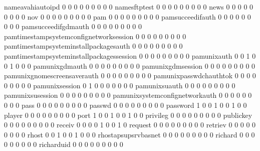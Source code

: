 \documentclass[compress,8pt]{beamer}
\begin{document}
\begin{frame}
\begin{Schunk}
  nameavahiautoipd                           0   0   0   0   0   0   0   0   0
  namesftptest                               0   0   0   0   0   0   0   0   0
  news                                       0   0   0   0   0   0   0   0   0
  nov                                        0   0   0   0   0   0   0   0   0
  pam                                        0   0   0   0   0   0   0   0   0
  pamsucceedifauth                           0   0   0   0   0   0   0   0   0
  pamsucceedifgdmauth                        0   0   0   0   0   0   0   0   0
  pamtimestampsystemconfignetworksession     0   0   0   0   0   0   0   0   0
  pamtimestampsysteminstallpackagesauth      0   0   0   0   0   0   0   0   0
  pamtimestampsysteminstallpackagessession   0   0   0   0   0   0   0   0   0
  pamunixauth                                0   0   1   0   0   1   0   0   0
  pamunixgdmauth                             0   0   0   0   0   0   0   0   0
  pamunixgdmsession                          0   0   0   0   0   0   0   0   0
  pamunixgnomescreensaverauth                0   0   0   0   0   0   0   0   0
  pamunixpasswdchauthtok                     0   0   0   0   0   0   0   0   0
  pamunixsession                             0   1   0   0   0   0   0   0   0
  pamunixsuauth                              0   0   0   0   0   0   0   0   0
  pamunixsusession                           0   0   0   0   0   0   0   0   0
  pamunixsystemconfignetworkauth             0   0   0   0   0   0   0   0   0
  pass                                       0   0   0   0   0   0   0   0   0
  passwd                                     0   0   0   0   0   0   0   0   0
  password                                   1   0   0   1   0   0   1   0   0
  player                                     0   0   0   0   0   0   0   0   0
  port                                       1   0   0   1   0   0   1   0   0
  privileg                                   0   0   0   0   0   0   0   0   0
  publickey                                  0   0   0   0   0   0   0   0   0
  receiv                                     0   0   0   0   1   0   0   1   0
  request                                    0   0   0   0   0   0   0   0   0
  retriev                                    0   0   0   0   0   0   0   0   0
  rhost                                      0   0   1   0   0   1   0   0   0
  rhostapsupsrvbasnet                        0   0   0   0   0   0   0   0   0
  richard                                    0   0   0   0   0   0   0   0   0
  richarduid                                 0   0   0   0   0   0   0   0   0

\end{Schunk}
\end{frame}
\end{document}
